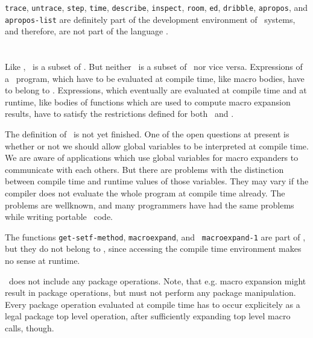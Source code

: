 {\tt trace}, {\tt untrace}, {\tt step}, {\tt time},
{\tt describe}, {\tt inspect}, {\tt room}, {\tt ed}, {\tt dribble},
{\tt apropos}, and {\tt apropos-list} are definitely part of the 
development environment of \CL\ systems, and therefore, are not part of 
the language .

\section{\clm}
\label{clm}

Like , \clm\ is a subset of \CL. But neither \clm\ is a subset of \ 
nor vice versa. Expressions of a \ program, which have to be evaluated 
at compile time, like macro bodies, have to belong to \clm. Expressions, 
which eventually are evaluated at compile time and at runtime, like
bodies of functions which are used to compute macro expansion results, have 
to satisfy the restrictions defined for both \cl0\ and \clm.

The definition of \clm\ is not yet finished. One of the open questions at 
present is whether or not we should allow global variables to be 
interpreted at compile time. We are aware of applications which use global 
variables for macro expanders to communicate with each others. But there 
are problems with the distinction between compile time and runtime values 
of those variables. They may vary if the compiler does not evaluate the 
whole program at compile time already. The problems are wellknown, and many 
programmers have had the same problems while writing portable \CL\ code.

The functions {\tt get-setf-method}, {\tt macroexpand}, and {\tt 
macroexpand-1} are part of \clm, but they do not belong to \cl0, since 
accessing the compile time environment makes no sense at runtime.


\clm\ does not include any package operations. Note, that e.g. macro 
expansion might result in package operations, but must not perform any 
package manipulation. Every package operation evaluated at compile
time has to occur explicitely as a legal package top level operation,
after sufficiently expanding top level macro calls, though.


